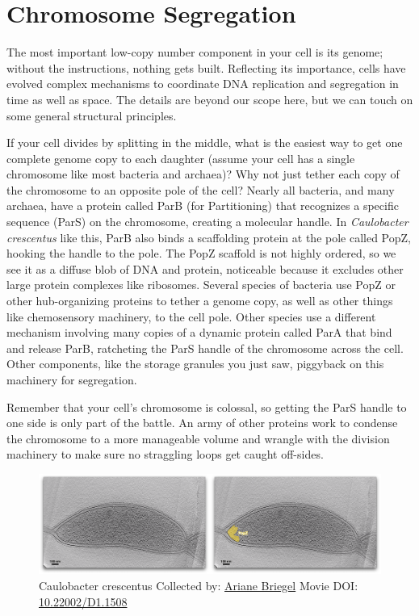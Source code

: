 \documentclass[]{tufte-book}
\begin{document}
\section{Chromosome Segregation}\label{chromosome-segregation}

The most important low-copy number component in your cell is its genome;
without the instructions, nothing gets built. Reflecting its importance,
cells have evolved complex mechanisms to coordinate DNA replication and
segregation in time as well as space. The details are beyond our scope
here, but we can touch on some general structural principles.

If your cell divides by splitting in the middle, what is the easiest way
to get one complete genome copy to each daughter (assume your cell has a
single chromosome like most bacteria and archaea)? Why not just tether
each copy of the chromosome to an opposite pole of the cell? Nearly all
bacteria, and many archaea, have a protein called ParB (for
Partitioning) that recognizes a specific sequence (ParS) on the
chromosome, creating a molecular handle. In \emph{Caulobacter
crescentus} like this, ParB also binds a scaffolding protein at the pole
called PopZ, hooking the handle to the pole. The PopZ scaffold is not
highly ordered, so we see it as a diffuse blob of DNA and protein,
noticeable because it excludes other large protein complexes like
ribosomes. Several species of bacteria use PopZ or other hub-organizing
proteins to tether a genome copy, as well as other things like
chemosensory machinery, to the cell pole. Other species use a different
mechanism involving many copies of a dynamic protein called ParA that
bind and release ParB, ratcheting the ParS handle of the chromosome
across the cell. Other components, like the storage granules you just
saw, piggyback on this machinery for segregation.

Remember that your cell's chromosome is colossal, so getting the ParS
handle to one side is only part of the battle. An army of other proteins
work to condense the chromosome to a more manageable volume and wrangle
with the division machinery to make sure no straggling loops get caught
off-sides.





\begin{figure}
\includegraphics{movie_stills/5_2} \caption[Caulobacter crescentus Collected by:
\protect\hyperlink{ariane_briegel}{Ariane Briegel} Movie DOI:
\href{https://doi.org/10.22002/D1.1508}{10.22002/D1.1508}]{Caulobacter crescentus Collected by:
\protect\hyperlink{ariane_briegel}{Ariane Briegel} Movie DOI:
\href{https://doi.org/10.22002/D1.1508}{10.22002/D1.1508}}\label{fig:5-2}
\end{figure}
\end{document}
